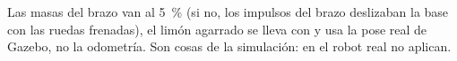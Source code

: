 \begin{nota}
Las masas del brazo van al 5~\% (si no, los impulsos del brazo deslizaban la base con las ruedas frenadas), el limón
agarrado se lleva con  y  usa la pose real de Gazebo, no la odometría. Son cosas de la
simulación: en el robot real no aplican.
\end{nota}
